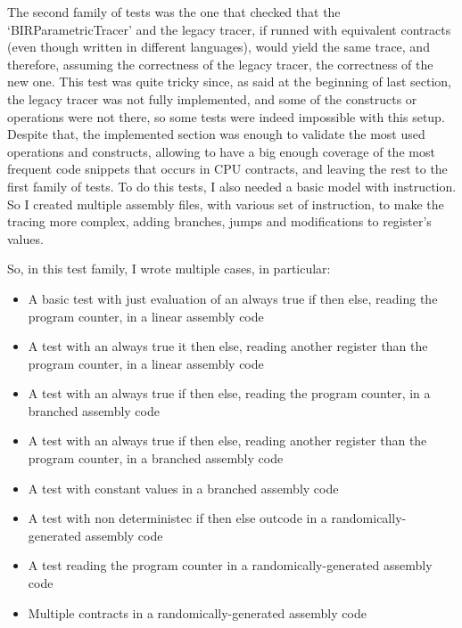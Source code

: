 The second family of tests was the one that checked that the `BIRParametricTracer'
and the legacy tracer, if runned with equivalent contracts (even though written in
different languages), would yield the same trace, and therefore, assuming the correctness
of the legacy tracer, the correctness of the new one. This test was quite tricky
since, as said at the beginning of last section, the legacy tracer was not fully
implemented, and some of the constructs or operations were not there, so some tests
were indeed impossible with this setup. Despite that, the implemented section was
enough to validate the most used operations and constructs, allowing to have a
big enough coverage of the most frequent code snippets that occurs in CPU
contracts, and leaving the rest to the first family of tests. To do this tests, I
also needed a basic model with instruction. So I created multiple assembly files,
with various set of instruction, to make the tracing more complex, adding branches,
jumps and modifications to register's values.

So, in this test family, I wrote multiple cases, in particular:
\begin{itemize}
  \item A basic test with just evaluation of an always true if then else,
    reading the program counter, in a linear assembly code

  \item A test with an always true it then else, reading another register than
    the program counter, in a linear assembly code

  \item A test with an always true if then else, reading the program counter, in
    a branched assembly code

  \item A test with an always true if then else, reading another register than
    the program counter, in a branched assembly code

  \item A test with constant values in a branched assembly code

  \item A test with non deterministec if then else outcode in a randomically-generated
    assembly code

  \item A test reading the program counter in a randomically-generated assembly code

  \item Multiple contracts in a randomically-generated assembly code
\end{itemize}

